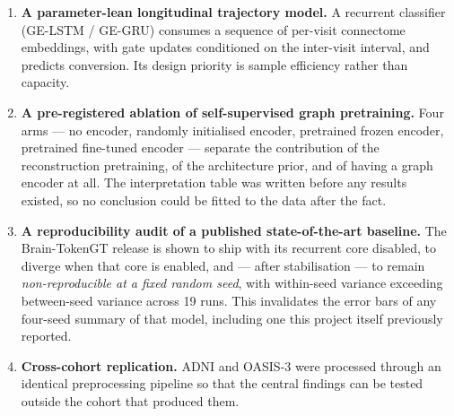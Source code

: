 \begin{enumerate}
  \item \textbf{A parameter-lean longitudinal trajectory model.} A recurrent classifier
    (GE-LSTM / GE-GRU) consumes a sequence of per-visit connectome embeddings, with gate
    updates conditioned on the inter-visit interval, and predicts conversion. Its design
    priority is sample efficiency rather than capacity.

  \item \textbf{A pre-registered ablation of self-supervised graph pretraining.} Four arms
    --- no encoder, randomly initialised encoder, pretrained frozen encoder, pretrained
    fine-tuned encoder --- separate the contribution of the reconstruction pretraining, of
    the architecture prior, and of having a graph encoder at all. The interpretation table
    was written before any results existed, so no conclusion could be fitted to the data
    after the fact.

  \item \textbf{A reproducibility audit of a published state-of-the-art baseline.} The
    Brain-TokenGT release is shown to ship with its recurrent core disabled, to diverge when
    that core is enabled, and --- after stabilisation --- to remain \emph{non-reproducible
    at a fixed random seed}, with within-seed variance exceeding between-seed variance
    across 19 runs. This invalidates the error bars of any four-seed summary of that model,
    including one this project itself previously reported.

  \item \textbf{Cross-cohort replication.} ADNI and OASIS-3 were processed through an
    identical preprocessing pipeline so that the central findings can be tested outside the
    cohort that produced them.
\end{enumerate}


